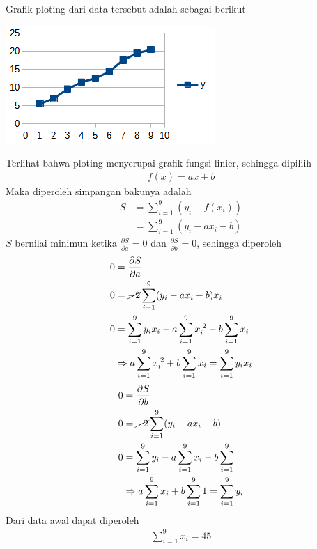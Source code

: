 \documentclass[12pt]{article}
\begin{document}
\begin{enumerate}
{        Grafik ploting dari data tersebut adalah sebagai berikut
        \begin{center}
            \includegraphics{grafik_1.png}
        \end{center}
        Terlihat bahwa ploting menyerupai grafik fungsi linier, sehingga dipiliih
        \begin{align*}
            f(x) = ax + b
        \end{align*}
        Maka diperoleh simpangan bakunya adalah
        \begin{align*}
            S   & = \sum_{i = 1}^9(y_i - f(x_i)) \\
                & = \sum_{i = 1}^9(y_i - ax_i - b)
        \end{align*}
        $ S $ bernilai minimun ketika $ \frac{\partial S}{\partial a} = 0 $ dan $ \frac{\partial S}{\partial b} = 0 $, sehingga diperoleh
        \begin{align*}
            0   & = \frac{\partial S}{\partial a}\\
            0   & = \cancel{-2}\sum_{i = 1}^{9}(y_i - ax_i - b)x_i\\
            0   & = \sum_{i = 1}^{9}y_ix_i - a\sum_{i = 1}^{9}x_i^{\;2} - b\sum_{i = 1}^{9}x_i \\
                & \Rightarrow a\sum_{i = 1}^{9}x_i^{\;2} + b\sum_{i = 1}^{9}x_i = \sum_{i = 1}^{9}y_ix_i
        \end{align*}
        \begin{align*}
            0   & = \frac{\partial S}{\partial b}\\
            0   & = \cancel{-2}\sum_{i = 1}^{9}(y_i - ax_i - b)\\
            0   & = \sum_{i = 1}^{9}y_i - a\sum_{i = 1}^{9}x_i - b\sum_{i = 1}^{9} \\
                & \Rightarrow a\sum_{i = 1}^{9}x_i + b\sum_{i = 1}^{9}1 = \sum_{i = 1}^{9}y_i
        \end{align*}
        Dari data awal dapat diperoleh
        \begin{align*}
            & \sum_{i = 1}^9x_i = 45 & 

\end{align*}}
\end{enumerate}
\end{document}
